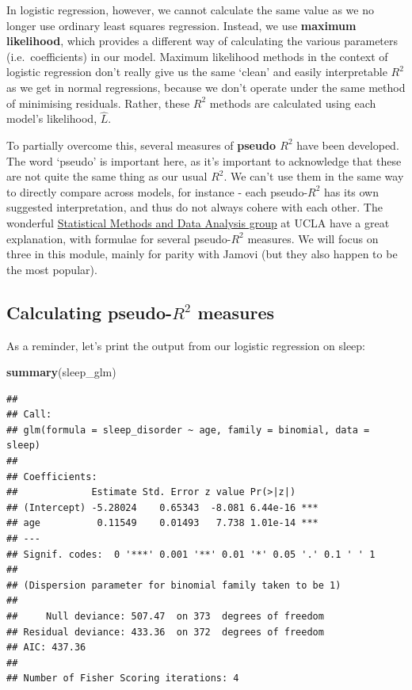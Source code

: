 \documentclass[
]{book}
\newenvironment{Shaded}{\begin{snugshade}}{\end{snugshade}}
\newcommand{\FunctionTok}[1]{\textcolor[rgb]{0.13,0.29,0.53}{\textbf{#1}}}
\newcommand{\NormalTok}[1]{#1}
\begin{document}
In logistic regression, however, we cannot calculate the same value as we no longer use ordinary least squares regression. Instead, we use \textbf{maximum likelihood}, which provides a different way of calculating the various parameters (i.e.~coefficients) in our model. Maximum likelihood methods in the context of logistic regression don't really give us the same `clean' and easily interpretable \(R^2\) as we get in normal regressions, because we don't operate under the same method of minimising residuals. Rather, these \(R^2\) methods are calculated using each model's likelihood, \(\hat L\).

To partially overcome this, several measures of \textbf{pseudo \(R^2\)} have been developed. The word `pseudo' is important here, as it's important to acknowledge that these are not quite the same thing as our usual \(R^2\). We can't use them in the same way to directly compare across models, for instance - each pseudo-\(R^2\) has its own suggested interpretation, and thus do not always cohere with each other. The wonderful \href{https://stats.oarc.ucla.edu/other/mult-pkg/faq/general/faq-what-are-pseudo-r-squareds/}{Statistical Methods and Data Analysis group} at UCLA have a great explanation, with formulae for several pseudo-\(R^2\) measures. We will focus on three in this module, mainly for parity with Jamovi (but they also happen to be the most popular).

\hypertarget{calculating-pseudo-r2-measures}{%
\subsection{\texorpdfstring{Calculating pseudo-\(R^2\) measures}{Calculating pseudo-R\^{}2 measures}}\label{calculating-pseudo-r2-measures}}

As a reminder, let's print the output from our logistic regression on sleep:

\begin{Shaded}
\begin{Highlighting}[]
\FunctionTok{summary}\NormalTok{(sleep\_glm)}
\end{Highlighting}
\end{Shaded}

\begin{verbatim}
## 
## Call:
## glm(formula = sleep_disorder ~ age, family = binomial, data = sleep)
## 
## Coefficients:
##             Estimate Std. Error z value Pr(>|z|)    
## (Intercept) -5.28024    0.65343  -8.081 6.44e-16 ***
## age          0.11549    0.01493   7.738 1.01e-14 ***
## ---
## Signif. codes:  0 '***' 0.001 '**' 0.01 '*' 0.05 '.' 0.1 ' ' 1
## 
## (Dispersion parameter for binomial family taken to be 1)
## 
##     Null deviance: 507.47  on 373  degrees of freedom
## Residual deviance: 433.36  on 372  degrees of freedom
## AIC: 437.36
## 
## Number of Fisher Scoring iterations: 4
\end{verbatim}
\end{document}
